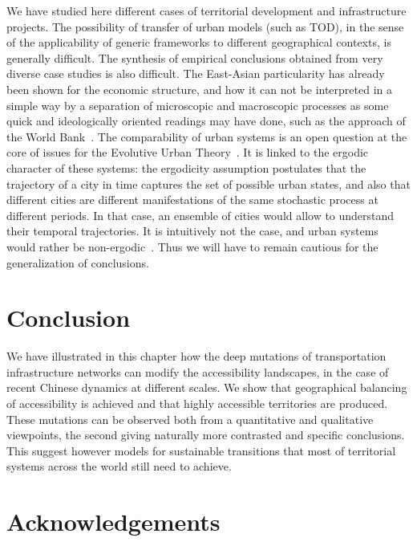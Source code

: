 \documentclass[11pt]{article}
\begin{document}
We have studied here different cases of territorial development and infrastructure projects. The possibility of transfer of urban models (such as TOD), in the sense of the applicability of generic frameworks to different geographical contexts, is generally difficult. The synthesis of empirical conclusions obtained from very diverse case studies is also difficult. The East-Asian particularity has already been shown for the economic structure, and how it can not be interpreted in a simple way by a separation of microscopic and macroscopic processes as some quick and ideologically oriented readings may have done, such as the approach of the World Bank~\citep{amsden1994isn}. The comparability of urban systems is an open question at the core of issues for the Evolutive Urban Theory~\citep{pumain2015multilevel}. It is linked to the ergodic character of these systems: the ergodicity assumption postulates that the trajectory of a city in time captures the set of possible urban states, and also that different cities are different manifestations of the same stochastic process at different periods. In that case, an ensemble of cities would allow to understand their temporal trajectories. It is intuitively not the case, and urban systems would rather be non-ergodic~\cite{pumain2012urban}. Thus we will have to remain cautious for the generalization of conclusions.




\section*{Conclusion}

We have illustrated in this chapter how the deep mutations of transportation infrastructure networks can modify the accessibility landscapes, in the case of recent Chinese dynamics at different scales. We show that geographical balancing of accessibility is achieved and that highly accessible territories are produced. These mutations can be observed both from a quantitative and qualitative viewpoints, the second giving naturally more contrasted and specific conclusions. This suggest however models for sustainable transitions that most of territorial systems across the world still need to achieve.



\section*{Acknowledgements}
\end{document}
